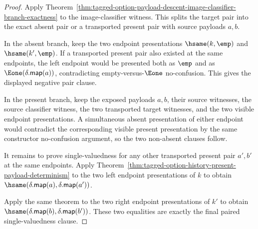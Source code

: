\begin{proof}
Apply
Theorem~\ref{thm:tagged-option-payload-descent-image-classifier-branch-exactness}
to the image-classifier witness. This splits the target pair into the exact
absent pair or a transported present pair with source payloads $a,b$.

In the absent branch, keep the two endpoint presentations
$\hsame(k,\emp)$ and $\hsame(k',\emp)$. If a transported present pair also
existed at the same endpoints, the left endpoint would be presented both as
$\emp$ and as $\Eone(\delta.\mathsf{map}(a))$, contradicting
empty-versus-$\Eone$ no-confusion. This gives the displayed negative pair
clause.

In the present branch, keep the exposed payloads $a,b$, their source witnesses,
the source classifier witness, the two transported target witnesses, and the two
visible endpoint presentations. A simultaneous absent presentation of either
endpoint would contradict the corresponding visible present presentation by the
same constructor no-confusion argument, so the two non-absent clauses follow.

It remains to prove single-valuedness for any other transported present pair
$a',b'$ at the same endpoints. Apply
Theorem~\ref{thm:tagged-option-history-present-payload-determinism} to the two
left endpoint presentations of $k$ to obtain
$\hsame(\delta.\mathsf{map}(a),\delta.\mathsf{map}(a'))$.

Apply the same theorem to the two right endpoint presentations of $k'$ to obtain
$\hsame(\delta.\mathsf{map}(b),\delta.\mathsf{map}(b'))$. These two equalities
are exactly the final paired single-valuedness clause.
\end{proof}

